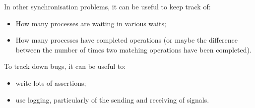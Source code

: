 

\begin{slide}

In other synchronisation problems, it can be useful to keep track of:
%
\begin{itemize}
\item 
How many processes are waiting in various waits;

\item
How many processes have completed operations (or maybe the difference between
the number of times two matching operations have been completed).
\end{itemize}

To track down bugs, it can be useful to:
\begin{itemize}
\item write lots of assertions;

\item use logging, particularly of the sending and receiving of
signals.
\end{itemize}
\end{slide}
